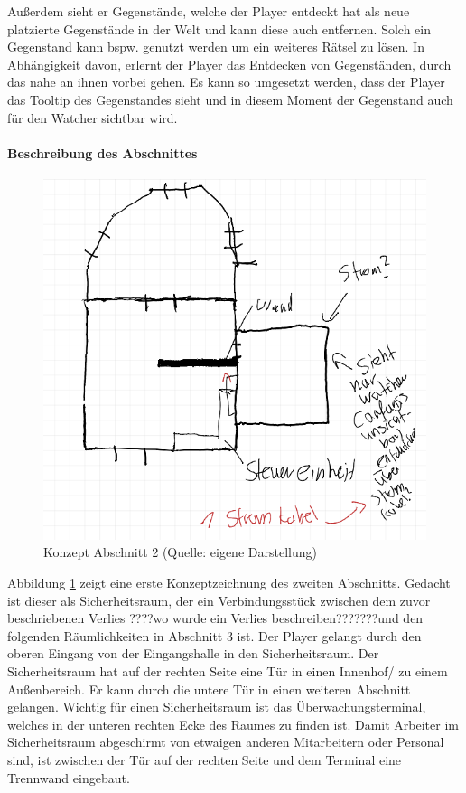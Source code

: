 Außerdem sieht er Gegenstände, welche der Player entdeckt hat als neue platzierte Gegenstände in der Welt und kann diese auch entfernen. Solch ein Gegenstand kann bspw. genutzt werden um ein weiteres Rätsel zu lösen.
In Abhängigkeit davon, erlernt der Player das Entdecken von Gegenständen, durch das nahe an ihnen vorbei gehen. Es kann so umgesetzt werden, dass der Player das Tooltip des Gegenstandes sieht und in diesem Moment der Gegenstand auch für den Watcher sichtbar wird.

\paragraph{Beschreibung des Abschnittes}

\begin{figure}[ht]
\centering
\includegraphics[width=1\linewidth]{content/pictures/Abschnitt_Concept_01.PNG}
\caption{Konzept Abschnitt 2 (Quelle: eigene Darstellung)}
\label{fig:section_01_concept}
\end{figure}

Abbildung \ref{fig:section_01_concept} zeigt eine erste Konzeptzeichnung des zweiten Abschnitts. Gedacht ist dieser als Sicherheitsraum, der ein Verbindungsstück zwischen dem zuvor beschriebenen Verlies ????wo wurde ein Verlies beschreiben???????und den folgenden Räumlichkeiten in Abschnitt 3 ist. Der Player gelangt durch den oberen Eingang von der Eingangshalle in den Sicherheitsraum. Der Sicherheitsraum hat auf der rechten Seite eine Tür in einen Innenhof/ zu einem Außenbereich. Er kann durch die untere Tür in einen weiteren Abschnitt gelangen. Wichtig für einen Sicherheitsraum ist das Überwachungsterminal, welches in der unteren rechten Ecke des Raumes zu finden ist. Damit Arbeiter im Sicherheitsraum abgeschirmt von etwaigen anderen Mitarbeitern oder Personal sind, ist zwischen der Tür auf der rechten Seite und dem Terminal eine Trennwand eingebaut.

